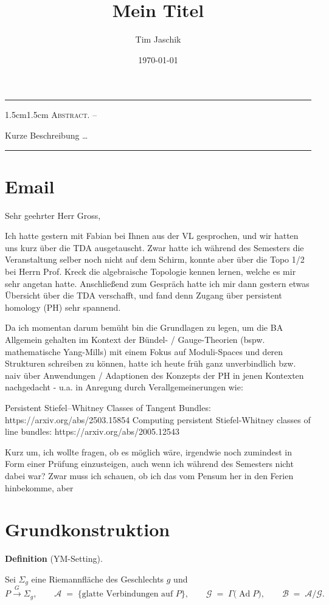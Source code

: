 \documentclass[10pt, letterpaper]{article}
\title{Mein Titel}
\author{Tim Jaschik}
\date{\today}
\renewenvironment{abstract}
  {
    \begin{adjustwidth}{1.5cm}{1.5cm}
    \small
    \textsc{Abstract. –}%
  }
  {
    \end{adjustwidth}
  }
\newcommand{\CustomHeading}[3]{%
  \par\medskip\noindent%
  \textbf{#1 #2} \textnormal{(#3)}.\enskip%
}
\newenvironment{DEF}[2]{\CustomHeading{Definition}{#1}{#2}}{}
\begin{document}
\maketitle
\rule{\textwidth}{0.5pt}
\begin{abstract}
Kurze Beschreibung …
\end{abstract}
\rule{\textwidth}{0.5pt}
\vspace{0.5cm}



\section{Email}
Sehr geehrter Herr Gross,

Ich hatte gestern mit Fabian bei Ihnen aus der VL gesprochen, und wir hatten uns kurz über die TDA ausgetauscht. Zwar hatte ich während des Semesters die Veranstaltung selber noch nicht auf dem Schirm, konnte aber über die Topo 1/2 bei Herrn Prof. Kreck die algebraische Topologie kennen lernen, welche es mir sehr angetan hatte. Anschließend zum Gespräch hatte ich mir dann gestern etwas Übersicht über die TDA verschafft, und fand denn Zugang über persistent homology (PH) sehr spannend. 

Da ich momentan darum bemüht bin die Grundlagen zu legen, um die BA Allgemein gehalten im Kontext der Bündel- / Gauge-Theorien (bspw. mathematische Yang-Mills) mit einem Fokus auf Moduli-Spaces und deren Strukturen schreiben zu können, hatte ich heute früh ganz unverbindlich bzw. naiv über Anwendungen / Adaptionen des Konzepts der PH in jenen Kontexten nachgedacht -  u.a. in Anregung durch Verallgemeinerungen wie:

Persistent Stiefel–Whitney Classes of Tangent  Bundles: https://arxiv.org/abs/2503.15854
Computing persistent Stiefel-Whitney classes  of line bundles: https://arxiv.org/abs/2005.12543
 



Kurz um, ich wollte fragen, ob es möglich wäre, irgendwie noch zumindest in Form einer Prüfung einzusteigen, auch wenn ich während des Semesters nicht dabei war? Zwar muss ich schauen, ob ich das vom Pensum her in den Ferien hinbekomme, aber  

\section{Grundkonstruktion}

\begin{DEF}{}{YM-Setting}
Sei $\Sigma_g$ eine Riemannfläche des Geschlechts \(g\) und
\[
  P \xrightarrow{G} \Sigma_g,
  \qquad
  \mathcal A \;=\;\bigl\{\text{glatte Verbindungen auf }P\bigr\},
  \qquad
  \mathcal G \;=\;\Gamma\!\bigl(\operatorname{Ad}P\bigr),
  \qquad
  \mathcal B \;=\; \mathcal A / \mathcal G .
\]
\end{DEF}
\end{document}
